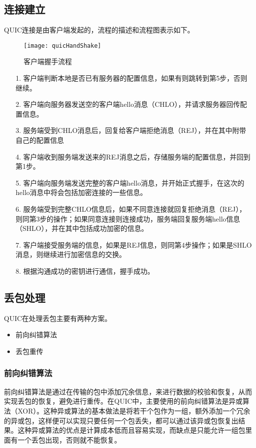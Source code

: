 \subsection{连接建立}
QUIC连接是由客户端发起的，流程的描述和流程图表示如下。
\begin{figure}
  \centering
  \texttt{[image: quicHandShake]}
  \caption{客户端握手流程}
  \label{fig:quichandshake}
\end{figure}
\begin{itemize}
  \item[1.] 客户端判断本地是否已有服务器的配置信息，如果有则跳转到第5步，否则继续。
  \item[2.] 客户端向服务器发送空的客户端hello消息（CHLO），并请求服务器回传配置信息。
  \item[3.] 服务端受到CHLO消息后，回复给客户端拒绝消息（REJ），并在其中附带自己的配置信息
  \item[4.] 客户端收到服务端发送来的REJ消息之后，存储服务端的配置信息，并回到第1步。
  \item[5.] 客户端向服务端发送完整的客户端hello消息，并开始正式握手，在这次的hello消息中将会包括加密连接的一些信息。
  \item[6.] 服务端受到完整CHLO信息后，如果不同意连接就回复拒绝消息（REJ），则同第3步的操作；如果同意连接则连接成功，服务端回复服务端hello信息（SHLO），并在其中包括成功加密的信息。
  \item[7.] 客户端接受服务端的信息，如果是REJ信息，则同第4步操作；如果是SHLO消息，则继续进行加密信息的交换。
  \item[8.] 根据沟通成功的密钥进行通信，握手成功。
\end{itemize}

\subsection{丢包处理}
QUIC在处理丢包主要有两种方案。
\begin{itemize}
  \item 前向纠错算法
  \item 丢包重传
\end{itemize}
\subsubsection{前向纠错算法}
前向纠错算法是通过在传输的包中添加冗余信息，来进行数据的校验和恢复，从而实现丢包的恢复，避免进行重传。在QUIC中，主要使用的前向纠错算法是异或算法（XOR）。这种异或算法的基本做法是将若干个包作为一组，额外添加一个冗余的异或包，这样便可以实现只要任何一个包丢失，都可以通过该异或包恢复出结果。这种异或算法的优点是计算成本低而且容易实现，而缺点是只能允许一组包里面有一个丢包出现，否则就不能恢复。
